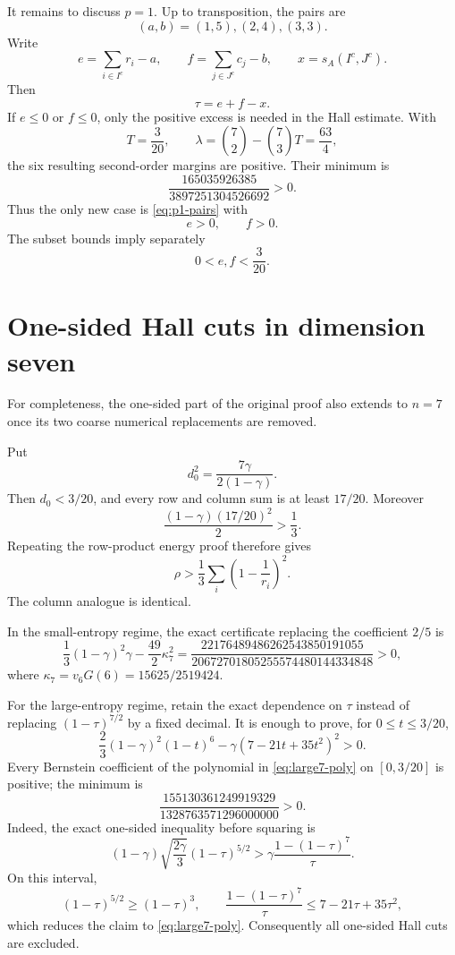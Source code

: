 \documentclass[11pt]{article}
\theoremstyle{definition}
\begin{document}
It remains to discuss $p=1$.  Up to transposition, the pairs are
\[
 (a,b)=(1,5),(2,4),(3,3).
 \tag{3.4}\label{eq:p1-pairs}
\]
Write
\[
 e=\sum_{i\in I^c}r_i-a,
 \qquad
 f=\sum_{j\in J^c}c_j-b,
 \qquad
 x=s_A(I^c,J^c).
\]
Then
\[
 \tau=e+f-x.
 \tag{3.5}\label{eq:tau-ef}
\]
If $e\le0$ or $f\le0$, only the positive excess is needed in the Hall estimate.  With
\[
 T=\frac3{20},
 \qquad \lambda=\binom72-\binom73T=\frac{63}{4},
\]
the six resulting second-order margins are positive.  Their minimum is
\[
 \frac{165035926385}{3897251304526692}>0.
 \tag{3.6}\label{eq:signmixed-min}
\]
Thus the only new case is \eqref{eq:p1-pairs} with
\[
 e>0,
 \qquad f>0.
 \tag{3.7}\label{eq:positive-ef}
\]
The subset bounds imply separately
\[
 0<e,f<\frac3{20}.
 \tag{3.8}\label{eq:ef-box}
\]

\section{One-sided Hall cuts in dimension seven}

For completeness, the one-sided part of the original proof also extends to $n=7$ once its two coarse numerical replacements are removed.

Put
\[
 d_0^2=\frac{7\gamma}{2(1-\gamma)}.
\]
Then $d_0<3/20$, and every row and column sum is at least $17/20$.  Moreover
\[
 \frac{(1-\gamma)(17/20)^2}{2}>\frac13.
 \tag{4.1}\label{eq:energy-coeff}
\]
Repeating the row-product energy proof therefore gives
\[
 \rho>\frac13\sum_i\left(1-\frac1{r_i}\right)^2.
 \tag{4.2}\label{eq:row-energy7}
\]
The column analogue is identical.

In the small-entropy regime, the exact certificate replacing the coefficient $2/5$ is
\[
 \frac13(1-\gamma)^2\gamma-\frac{49}{2}\kappa_7^2
 =
 \frac{22176489486262543850191055}
 {20672701805255574480144334848}>0,
 \tag{4.3}\label{eq:small7}
\]
where $\kappa_7=v_6G(6)=15625/2519424$.

For the large-entropy regime, retain the exact dependence on $\tau$ instead of replacing $(1-\tau)^{7/2}$ by a fixed decimal.  It is enough to prove, for $0\le t\le3/20$,
\[
 \frac23(1-\gamma)^2(1-t)^6
 -\gamma(7-21t+35t^2)^2>0.
 \tag{4.4}\label{eq:large7-poly}
\]
Every Bernstein coefficient of the polynomial in \eqref{eq:large7-poly} on $[0,3/20]$ is positive; the minimum is
\[
 \frac{155130361249919329}
 {1328763571296000000}>0.
 \tag{4.5}\label{eq:large7}
\]
Indeed, the exact one-sided inequality before squaring is
\[
 (1-\gamma)\sqrt{\frac{2\gamma}{3}}
 (1-\tau)^{5/2}
 >
 \gamma\frac{1-(1-\tau)^7}{\tau}.
\]
On this interval,
\[
 (1-\tau)^{5/2}\ge(1-\tau)^3,
 \qquad
 \frac{1-(1-\tau)^7}{\tau}
 \le7-21\tau+35\tau^2,
\]
which reduces the claim to \eqref{eq:large7-poly}.  Consequently all one-sided Hall cuts are excluded.
\end{document}
